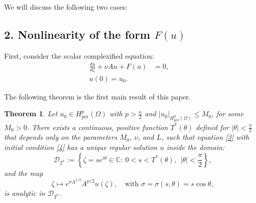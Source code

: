 \documentclass[12pt]{article}
\theoremstyle{plain}
\newtheorem{theorem}{Theorem}
\theoremstyle{remark}
\newcommand{\Hper}{H_{\mathrm{per}}}
\begin{document}
 We will discuss the following two cases:
 \subsection*{ 2. Nonlinearity of the form \texorpdfstring{$F(u)$}{F(u)} }
First, consider the scalar complexified equation:
\begin{align}
    \frac{du}{d\zeta} + \nu Au + F(u) &= 0 ,\quad\label{3}\\
    u(0) = u_0.  \label{4}
\end{align}

The following theorem is the first main result of this paper.

\begin{theorem}
Let $u_0 \in  \Hper ^p (\Omega)$ with $p > \frac{n}{2}$ and $|u_0|_{\Hper ^p (\Omega)} \le M_0$, for some $M_0 > 0$. There exists a continuous, positive function $T^*(\theta)$ defined for $|\theta| < \frac{\pi}{2}$ that depends only on the parameters $M_0$, $\nu$, and $L$, such that equation \eqref{3} with initial condition \eqref{4} has a unique regular solution $u$ inside the domain:
\[
\mathcal{D}_{T^*} := \left\{\zeta = s e^{i\theta} \in \mathbb{C} :\ 0 < s < T^*(\theta), \ \ |\theta| < \frac{\pi}{2}\right\},
\]
and the map
\[
\zeta \longmapsto e^{\sigma A^{1/2}} A^{p/2} u(\zeta), \quad \text{with } \sigma = \sigma(s,\theta) = s\cos\theta,
\]
is analytic in $\mathcal{D}_{T^*}$.
\end{theorem}
\end{document}
